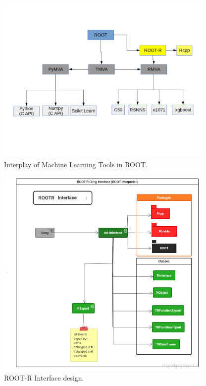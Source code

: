 \documentclass[a4paper]{jpconf}
\begin{document}
\begin{figure}[h]
\centering
\includegraphics[width=25pc]{img/tmva.png}\caption{\label{tmva:label} Interplay of Machine Learning Tools in ROOT.}
\end{figure}

\begin{figure}[h]
\centering
\includegraphics[width=25pc]{img/rootr.png}\caption{\label{rootr:label} ROOT-R Interface design.}
\end{figure}
\end{document}
